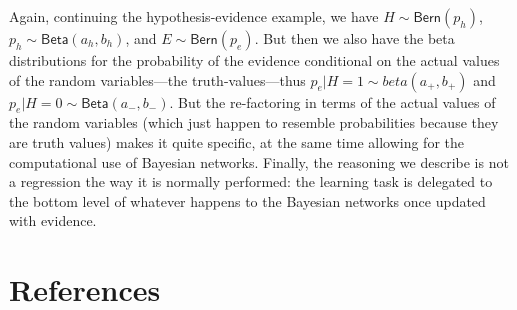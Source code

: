\documentclass[
  10pt,
  dvipsnames,enabledeprecatedfontcommands]{scrartcl}
\begin{document}
Again, continuing the hypothesis-evidence example, we have
\(H \sim \mathsf{Bern}(p_h)\), \(p_h \sim \mathsf{Beta}(a_h, b_h)\), and
\(E\sim \mathsf{Bern}(p_e)\). But then we also have the beta
distributions for the probability of the evidence conditional on the
actual values of the random variables---the truth-values---thus
\(p_e \vert H = 1 \sim beta(a_{+}, b_{+} )\) and
\(p_e \vert H = 0 \sim \mathsf{Beta}(a_{-}, b_{-})\). But the
re-factoring in terms of the actual values of the random variables
(which just happen to resemble probabilities because they are truth
values) makes it quite specific, at the same time allowing for the
computational use of Bayesian networks. Finally, the reasoning we
describe is not a regression the way it is normally performed: the
learning task is delegated to the bottom level of whatever happens to
the Bayesian networks once updated with evidence.

\hypertarget{references}{%
\section*{References}\label{references}}
\end{document}
